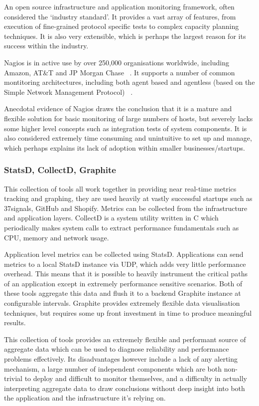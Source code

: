 \documentclass{cshonours}
\begin{document}
An open source infrastructure and application monitoring framework, often considered the ‘industry standard’. It provides a vast array of features, from execution of fine-grained protocol specific tests to complex capacity planning techniques. It is also very extensible, which is perhaps the largest reason for its success within the industry.

Nagios is in active use by over 250,000 organisations worldwide, including Amazon, AT\&T and JP Morgan Chase ~\cite{NagiosUsage}. It supports a number of common montitoring architectures, including both agent based and agentless (based on the Simple Network Management Protocol) ~\cite{NagiosArchitectures}. 

Anecdotal evidence of Nagios draws the conclusion that it is a mature and flexible solution for basic monitoring of large numbers of hosts, but severely lacks some higher level concepts such as integration tests of system components. It is also considered extremely time consuming and unintuitive to set up and manage, which perhaps explains its lack of adoption within smaller businesses/startups.

\subsubsection{StatsD, CollectD, Graphite}

This collection of tools all work together in providing near real-time metrics tracking and graphing, they are used heavily at vastly successful startups such as 37signals, GitHub and Shopify. Metrics can be collected from the infrastructure and application layers. 
CollectD is a system utility written in C which periodically makes system calls to extract performance fundamentals such as CPU, memory and network usage. 

Application level metrics can be collected using StatsD. Applications can send metrics to a local StatsD instance via UDP, which adds very little performance overhead. This means that it is possible to heavily instrument the critical paths of an application except in extremely performance sensitive scenarios. Both of these tools aggregate this data and flush it to a backend Graphite instance at configurable intervals. Graphite provides extremely flexible data visualisation techniques, but requires some up front investment in time to produce meaningful results.

This collection of tools provides an extremely flexible and performant source of aggregate data which can be used to diagnose reliability and performance problems effectively. Its disadvantages however include a lack of any alerting mechanism, a large number of independent components which are both non-trivial to deploy and difficult to monitor themselves, and a difficulty in actually interpreting aggregate data to draw conclusions without deep insight into both the application and the infrastructure it’s relying on.
\end{document}
